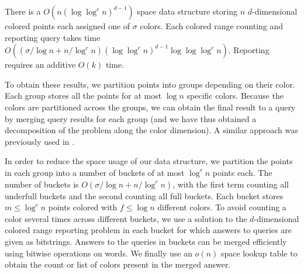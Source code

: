 \begin{theorem}\label{thm:dD}
  There is a $O(n (\log \log ^{c} n) ^{d-1})$ space data structure storing $n$ $d$-dimensional colored points each assigned one of $\sigma$ colors. Each colored range counting and reporting query takes time $O(( \sigma / \log n + n / \log ^c n ) (\log \log ^{c} n) ^{d-1} \log \log \log ^c n )$. Reporting requires an additive $O(k)$ time.
\end{theorem}

To obtain these results, we partition points into groups depending on their color. Each group stores all the points for at most $\log n$ specific colors. Because the colors are partitioned across the groups, we can obtain the final result to a query by merging query results for each group (and we have thus obtained a decomposition of the problem along the color dimension). A similar approach was previously used in \cite{kaplan2007counting}.

In order to reduce the space usage of our data structure, we partition the points in each group into a number of buckets of at most $\log^c n$ points each. The number of buckets is $O(\sigma / \log n + n / \log ^c n)$, with the first term counting all underfull buckets and the second counting all full buckets. Each bucket stores $m \leq \log ^c n$ points colored with $f \leq \log n$ different colors.
To avoid counting a color several times across different buckets, we use a solution to the $d$-dimensional colored range reporting problem in each bucket for which answers to queries are given as bitstrings. Answers to the queries in buckets can be merged efficiently using bitwise operations on words.
We finally use an $o(n)$ space lookup table to obtain the count or list of colors present in the merged answer. 

